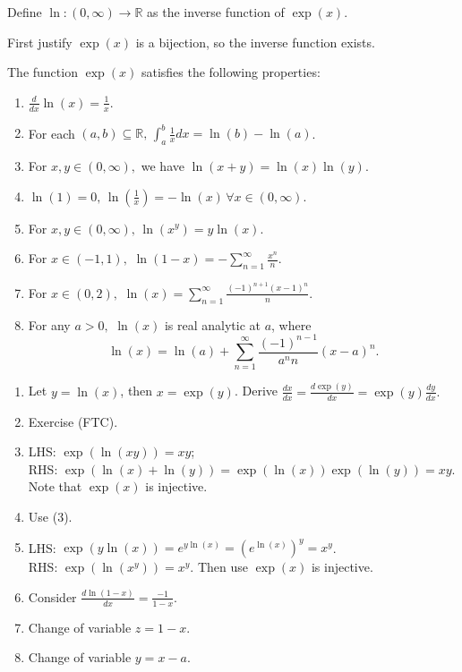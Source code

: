\documentclass[12pt]{article}
\begin{document}
\begin{definition}
    Define $\ln:(0,\infty)\rightarrow\mathbb{R}$ as the inverse function of $\exp(x)$.
\end{definition}

\begin{remark}
    First justify $\exp(x)$ is a bijection, so the inverse function exists.
\end{remark}

\begin{property}
    The function $\exp(x)$ satisfies the following properties:
    \begin{enumerate}
        \item $\frac{d}{dx}\ln(x)=\frac{1}{x}.$
        \item For each $(a,b)\subseteq \mathbb{R},\, \int_{a}^{b}\frac{1}{x}dx = \ln(b)-\ln(a)$.
        \item For $x,y\in (0,\infty),$ we have $\ln(x+y)=\ln(x)\ln(y).$
        \item $\ln(1)=0,\, \ln(\frac{1}{x})=-\ln(x)\,\forall x\in (0,\infty)$.
        \item For $x,y\in (0,\infty),\, \ln(x^y)=y\ln(x).$
        \item For $x\in (-1,1),$ $\ln(1-x)=-\sum_{n=1}^{\infty}\frac{x^n}{n}$.
        \item For $x\in (0,2),$ $\ln(x)=\sum_{n=1}^{\infty}\frac{(-1)^{n+1}(x-1)^n}{n}.$
        \item For any $a>0,$ $\ln(x)$ is real analytic at $a$, where 
        \[\ln(x)=\ln(a)+\sum_{n=1}^{\infty}\frac{(-1)^{n-1}}{a^n n}(x-a)^n.\]
    \end{enumerate}
\end{property}

\begin{pfbox}
    \begin{enumerate}
        \item Let $y=\ln(x)$, then $x=\exp(y)$. Derive $\frac{dx}{dx}=\frac{d\exp(y)}{dx}=\exp(y)\frac{dy}{dx}.$
        \item Exercise (FTC).
        \item LHS: $\exp(\ln(xy))=xy$;\\
              RHS: $\exp(\ln(x)+\ln(y))=\exp(\ln(x))\exp(\ln(y))=xy$. Note that $\exp(x)$ is injective.
        \item Use (3).
        \item LHS: $\exp(y\ln(x))=e^{y\ln(x)}=(e^{\ln(x)})^y = x^y$.\\
              RHS: $\exp(\ln(x^y))=x^y$. Then use $\exp(x)$ is injective.
        \item Consider $\frac{d\ln(1-x)}{dx}=\frac{-1}{1-x}$.
        \item Change of variable $z=1-x$.
        \item Change of variable $y=x-a$.
    \end{enumerate}
\end{pfbox}
\end{document}
